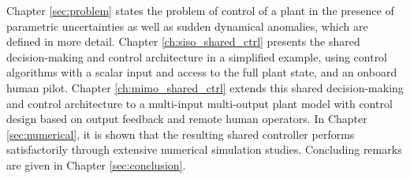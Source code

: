 Chapter \ref{sec:problem} states the problem of control of a plant in the presence of parametric uncertainties as well as sudden dynamical anomalies, which are defined in more detail. Chapter \ref{ch:siso_shared_ctrl} presents the shared decision-making and control architecture in a simplified example, using control algorithms with a scalar input and access to the full plant state, and an onboard human pilot. Chapter \ref{ch:mimo_shared_ctrl} extends this shared decision-making and control architecture to a multi-input multi-output plant model with control design based on output feedback and remote human operators. In Chapter \ref{sec:numerical}, it is shown that the resulting shared controller performs satisfactorily through extensive numerical simulation studies. Concluding remarks are given in Chapter \ref{sec:conclusion}.

